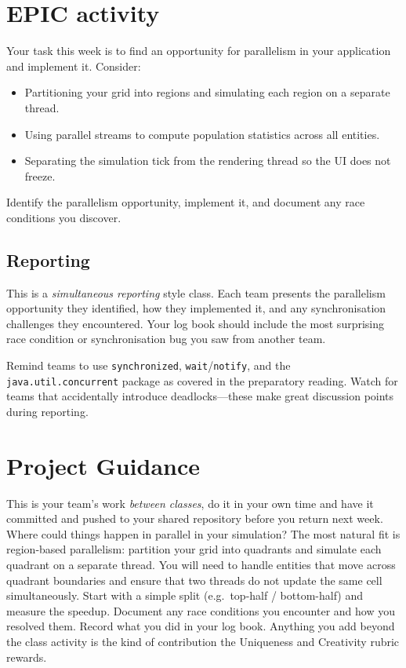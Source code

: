 \documentclass[twoside=false,DIV=14]{scrartcl}
\begin{document}
\section*{EPIC activity}

Your task this week is to find an opportunity for parallelism in your application and implement it.  Consider:
\begin{itemize}
\itemsep0em
\item Partitioning your grid into regions and simulating each region on a separate thread.
\item Using parallel streams to compute population statistics across all entities.
\item Separating the simulation tick from the rendering thread so the UI does not freeze.
\end{itemize}

Identify the parallelism opportunity, implement it, and document any race conditions you discover.

\subsection*{Reporting}

This is a \emph{simultaneous reporting} style class.  Each team presents the parallelism opportunity they identified, how they implemented it, and any synchronisation challenges they encountered.  Your log book should include the most surprising race condition or synchronisation bug you saw from another team.

\begin{teacher}
Remind teams to use \texttt{synchronized}, \texttt{wait}/\texttt{notify}, and the \texttt{java.util.concurrent} package as covered in the preparatory reading.  Watch for teams that accidentally introduce deadlocks---these make great discussion points during reporting.
\end{teacher}

\section*{Project Guidance}

This is your team's work \emph{between classes}, do it in your own time and have it committed and pushed to your shared repository before you return next week.  Where could things happen in parallel in your simulation?  The most natural fit is region-based parallelism: partition your grid into quadrants and simulate each quadrant on a separate thread.  You will need to handle entities that move across quadrant boundaries and ensure that two threads do not update the same cell simultaneously.  Start with a simple split (e.g.\ top-half / bottom-half) and measure the speedup.  Document any race conditions you encounter and how you resolved them.  Record what you did in your log book.  Anything you add beyond the class activity is the kind of contribution the Uniqueness and Creativity rubric rewards.
\end{document}
